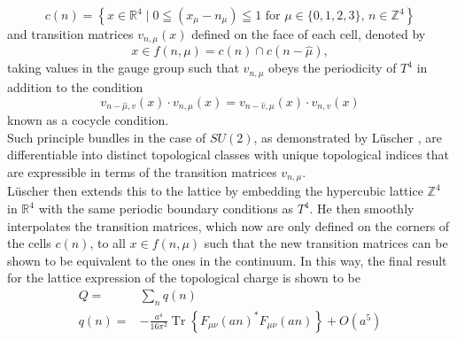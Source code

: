 \documentclass[a4paper,10pt]{article}
\begin{document}
\begin{equation}
c(n)=\left\{x \in \mathbb{R}^{4} \mid 0 \leqq\left(x_{\mu}-n_{\mu}\right) \leqq 1 \text { for } \mu\in\{0,1,2,3\},\,n \in \mathbb{Z}^{4}\right\}
\end{equation}
and transition matrices $v_{n,\mu}(x)$ defined on the face of each cell, denoted by
\begin{equation}
x\in f(n,\mu) = c(n) \cap c(n-\hat{\mu}),
\end{equation}
taking values in the gauge group such that $v_{n,\mu}$ obeys the periodicity of $T^4$ in addition to the condition 
\begin{equation}
v_{n-\hat{\mu}, v}(x) \cdot v_{n, \mu}(x)=v_{n-\hat{v}, \mu}(x) \cdot v_{n, v}(x)
\end{equation}
known as a cocycle condition.\\
Such principle bundles in the case of $SU(2)$, as demonstrated by Lüscher \cite{L_scherM1982Tolg}, are differentiable into distinct topological classes with unique topological indices that are expressible in terms of the transition matrices $v_{n,\mu}$.\\Lüscher then extends this to the lattice by embedding the hypercubic lattice $\mathbb{Z}^{4}$ in $\mathbb{R}^{4}$ with the same periodic boundary conditions as $T^4$. He then smoothly interpolates the transition matrices, which now are only defined on the corners of the cells $c(n)$, to all $x\in f(n,\mu)$ such that the new transition matrices can be shown to be equivalent to the ones in the continuum. In this way, the final result for the lattice expression of the topological charge is shown to be
\begin{equation}
\begin{aligned} 
Q=&\sum_{n} q(n)\\
q(n)=&-\frac{a^{4}}{16 \pi^{2}} \operatorname{Tr}\left\{F_{\mu \nu}(a n) ^* F_{\mu \nu}(a n)\right\}+O\left(a^{5}\right)
\end{aligned}
\end{equation}
\end{document}
